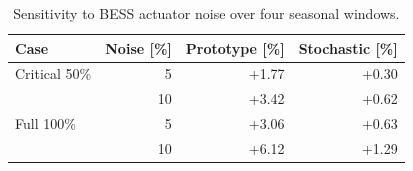 \begin{table}[t]
\centering
\small
\caption{Sensitivity to BESS actuator noise over four seasonal windows.}
\label{tab:robustness}
\begin{tabular}{lrrr}
\toprule
Case & Noise [\%] & Prototype [\%] & Stochastic [\%] \\
\midrule
Critical 50\% & 5 & +1.77 & +0.30 \\
 & 10 & +3.42 & +0.62 \\
Full 100\% & 5 & +3.06 & +0.63 \\
 & 10 & +6.12 & +1.29 \\
\bottomrule
\end{tabular}
\par\vspace{1mm}{\footnotesize Entries are mean operating-cost changes relative to each controller's noise-free base case.}
\end{table}
